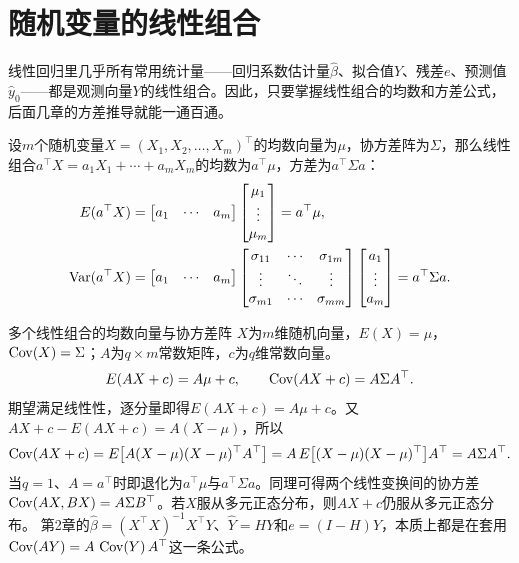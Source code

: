 \Needspace{.3\textheight}
\section{随机变量的线性组合}\label{sec:lincomb}
线性回归里几乎所有常用统计量——回归系数估计量$\widehat\beta$、拟合值$\widehat Y$、残差$e$、预测值$\widehat y_0$——都是观测向量$Y$的线性组合。因此，只要掌握线性组合的均数和方差公式，后面几章的方差推导就能一通百通。

设$m$个随机变量$X=(X_1,X_2,\ldots,X_m)^\top$的均数向量为$\mu$，协方差阵为$\Sigma$，那么线性组合$a^\top X=a_1X_1+\cdots+a_mX_m$的均数为$a^\top\mu$，方差为$a^\top\Sigma a$：
\begin{align*}
E(a^\top X)&=\begin{bmatrix}a_1&\cdots&a_m\end{bmatrix}
\begin{bmatrix}\mu_1\\\vdots\\\mu_m\end{bmatrix}=a^\top\mu,\\
\operatorname{Var}(a^\top X)&=\begin{bmatrix}a_1&\cdots&a_m\end{bmatrix}
\begin{bmatrix}\sigma_{11}&\cdots&\sigma_{1m}\\\vdots&\ddots&\vdots\\\sigma_{m1}&\cdots&\sigma_{mm}\end{bmatrix}
\begin{bmatrix}a_1\\\vdots\\a_m\end{bmatrix}=a^\top\Sigma a.
\end{align*}
\begin{derivation}{多个线性组合的均数向量与协方差阵}
$X$为$m$维随机向量，$E(X)=\mu$，$\operatorname{Cov}(X)=\Sigma$；$A$为$q\times m$常数矩阵，$c$为$q$维常数向量。
\[
E(AX+c)=A\mu+c,\qquad \operatorname{Cov}(AX+c)=A\Sigma A^\top .
\]
期望满足线性性，逐分量即得$E(AX+c)=A\mu+c$。又$AX+c-E(AX+c)=A(X-\mu)$，所以
\[
\operatorname{Cov}(AX+c)=E\bigl[A(X-\mu)(X-\mu)^\top A^\top\bigr]=A\,E\bigl[(X-\mu)(X-\mu)^\top\bigr]A^\top=A\Sigma A^\top .
\]
当$q=1$、$A=a^\top$时即退化为$a^\top\mu$与$a^\top\Sigma a$。同理可得两个线性变换间的协方差$\operatorname{Cov}(AX,BX)=A\Sigma B^\top$。若$X$服从多元正态分布，则$AX+c$仍服从多元正态分布。
第2章的$\widehat\beta=(X^\top X)^{-1}X^\top Y$、$\widehat Y=HY$和$e=(I-H)Y$，本质上都是在套用$\operatorname{Cov}(AY)=A\,\operatorname{Cov}(Y)\,A^\top$这一条公式。
\end{derivation}

